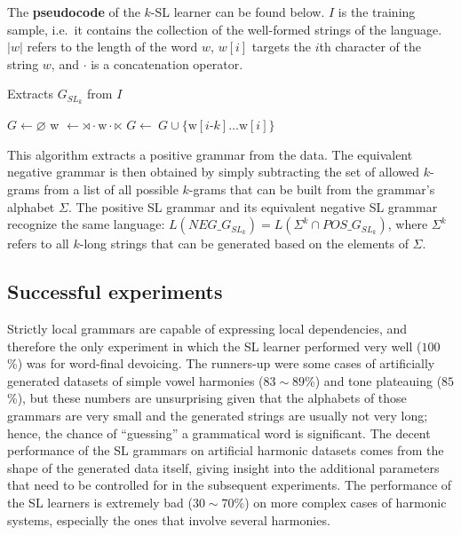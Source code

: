The \textbf{pseudocode} of the $k$-SL learner can be found below.
$I$ is the training sample, i.e.\ it contains the collection of the well-formed strings of the language.
$|w|$ refers to the length of the word $w$, $w[i]$ targets the $i$th character of the string $w$, and $\cdot$ is a concatenation operator.

\begin{algorithm}[h!]
\caption{Extracts $G_{SL_k}$ from $I$}
\begin{algorithmic}
\STATE $G \leftarrow \varnothing$
	\STATE w $\leftarrow \rtimes\cdot\textrm{w}\cdot\ltimes$
			\STATE $G \leftarrow~ G \cup \{\textrm{w}[i\textrm{-}k]\dots\textrm{w}[i]\}$
		\ENDFOR
	\ENDIF
\ENDFOR
\end{algorithmic}
\end{algorithm}

This algorithm extracts a positive grammar from the data.
The equivalent negative grammar is then obtained by simply subtracting the set of allowed $k$-grams from a list of all possible $k$-grams that can be built from the grammar's alphabet $\Sigma$.
The positive SL grammar and its equivalent negative SL grammar recognize the same language: $L(NEG\_G_{SL_k}) = L(\Sigma^k \cap POS\_G_{SL_k})$, where $\Sigma^k$ refers to all $k$-long strings that can be generated based on the elements of $\Sigma$.


\subsection{Successful experiments}

Strictly local grammars are capable of expressing local dependencies, and therefore the only experiment in which the SL learner performed very well ($100$\%) was for word-final devoicing.
The runners-up were some cases of artificially generated datasets of simple vowel harmonies ($83\sim89$\%) and tone plateauing ($85$\%), but these numbers are unsurprising given that the alphabets of those grammars are very small and the generated strings are usually not very long; hence, the chance of ``guessing'' a grammatical word is significant.
The decent performance of the SL grammars on artificial harmonic datasets comes from the shape of the generated data itself, giving insight into the additional parameters that need to be controlled for in the subsequent experiments.
The performance of the SL learners is extremely bad ($30\sim70$\%) on more complex cases of harmonic systems, especially the ones that involve several harmonies.


